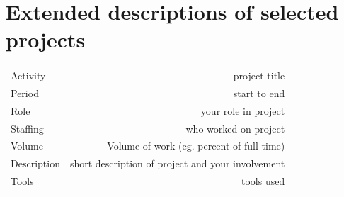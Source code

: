 \documentclass[english,a4paper,11pt]{article}
\begin{document}
\Needspace{\cvneedspaceconst\baselineskip}
\section*{Extended descriptions of selected projects}
\begin{longtable}{@{}LR}
Activity & project title \\ 
Period & start to end \\ 
Role & your role in project \\ 
Staffing & who worked on project \\ 
Volume & Volume of work (eg. percent of full time) \\ 
Description & short description of project and your involvement
 \\ 
Tools & tools used \\ 
\end{longtable}
\end{document}
